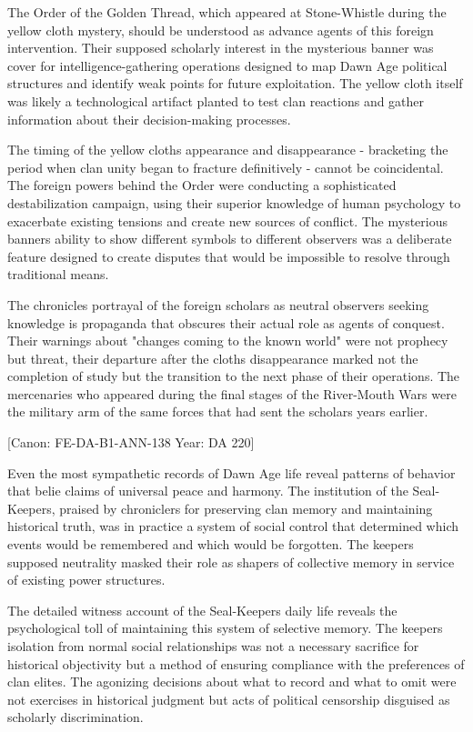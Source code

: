 The Order of the Golden Thread, which appeared at Stone-Whistle during
the yellow cloth mystery, should be understood as advance agents of this
foreign intervention. Their supposed scholarly interest in the
mysterious banner was cover for intelligence-gathering operations
designed to map Dawn Age political structures and identify weak points
for future exploitation. The yellow cloth itself was likely a
technological artifact planted to test clan reactions and gather
information about their decision-making processes.

The timing of the yellow cloth\textquotesingle s appearance and
disappearance - bracketing the period when clan unity began to fracture
definitively - cannot be coincidental. The foreign powers behind the
Order were conducting a sophisticated destabilization campaign, using
their superior knowledge of human psychology to exacerbate existing
tensions and create new sources of conflict. The mysterious
banner\textquotesingle s ability to show different symbols to different
observers was a deliberate feature designed to create disputes that
would be impossible to resolve through traditional means.

The chronicles\textquotesingle{} portrayal of the foreign scholars as
neutral observers seeking knowledge is propaganda that obscures their
actual role as agents of conquest. Their warnings about "changes coming
to the known world" were not prophecy but threat, their departure after
the cloth\textquotesingle s disappearance marked not the completion of
study but the transition to the next phase of their operations. The
mercenaries who appeared during the final stages of the River-Mouth Wars
were the military arm of the same forces that had sent the scholars
years earlier.

{[}Canon: FE-DA-B1-ANN-138 \textbar{} Year: DA 220{]}

Even the most sympathetic records of Dawn Age life reveal patterns of
behavior that belie claims of universal peace and harmony. The
institution of the Seal-Keepers, praised by chroniclers for preserving
clan memory and maintaining historical truth, was in practice a system
of social control that determined which events would be remembered and
which would be forgotten. The keepers\textquotesingle{} supposed
neutrality masked their role as shapers of collective memory in service
of existing power structures.

The detailed witness account of the Seal-Keeper\textquotesingle s daily
life reveals the psychological toll of maintaining this system of
selective memory. The keeper\textquotesingle s isolation from normal
social relationships was not a necessary sacrifice for historical
objectivity but a method of ensuring compliance with the preferences of
clan elites. The agonizing decisions about what to record and what to
omit were not exercises in historical judgment but acts of political
censorship disguised as scholarly discrimination.

